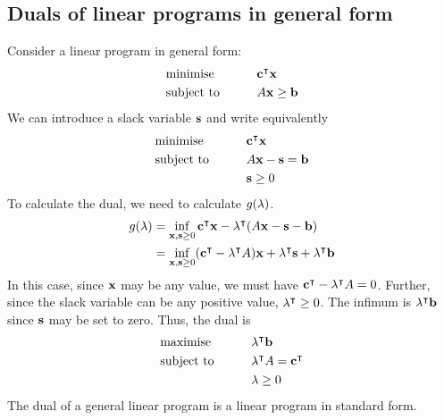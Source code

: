 \subsection{Duals of linear programs in general form}
Consider a linear program in general form:
\begin{alignat*}{2}
	 & \text{minimise}   & \qquad & \vb c^\intercal \vb x \\
	 & \text{subject to} &        & A \vb x \geq \vb b     \\
\end{alignat*}
We can introduce a slack variable \( \vb s \) and write equivalently
\begin{alignat*}{2}
	 & \text{minimise}   & \qquad & \vb c^\intercal \vb x  \\
	 & \text{subject to} &        & A \vb x - \vb s = \vb b \\
	 &                   &        & \vb s \geq 0
\end{alignat*}
To calculate the dual, we need to calculate \( g(\vb \lambda) \).
\begin{align*}
	g(\vb \lambda) & = \inf_{\vb x, \vb s \geq 0} \vb c^\intercal \vb x - \vb \lambda^\intercal (A \vb x - \vb s - \vb b)                                         \\
	               & = \inf_{\vb x, \vb s \geq 0} (\vb c^\intercal - \vb \lambda^\intercal A) \vb x + \vb \lambda^\intercal \vb s + \vb \lambda^\intercal \vb b \\
\end{align*}
In this case, since \( \vb x \) may be any value, we must have \( \vb c^\intercal - \vb \lambda^\intercal A = 0 \).
Further, since the slack variable can be any positive value, \( \vb \lambda^\intercal \geq 0 \).
The infimum is \( \vb \lambda^\intercal \vb b \) since \( \vb s \) may be set to zero.
Thus, the dual is
\begin{alignat*}{2}
	 & \text{maximise}   & \qquad & \vb \lambda^\intercal \vb b                \\
	 & \text{subject to} &        & \vb \lambda^\intercal A = \vb c^\intercal \\
	 &                   &        & \vb \lambda \geq 0
\end{alignat*}
The dual of a general linear program is a linear program in standard form.

